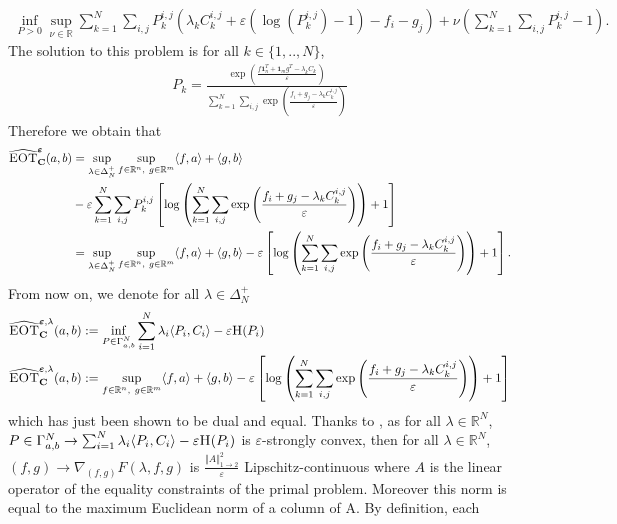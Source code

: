 \begin{prv*}
\begin{align*}
\inf_{P>0}\sup_{\nu \in\mathbb{R}}
   \sum_{k=1}^N \sum_{i,j} P_k^{i,j} \left(\lambda_k C_k^{i,j} +\varepsilon\left(\log(P_k^{i,j})-1\right) -f_i - g_j \right) +\nu\left(\sum_{k=1}^N \sum_{i,j} P_k^{i,j}-1 \right).
\end{align*}
The solution to this problem is for all $k\in\{1,..,N\}$,
\begin{align*}
     P_k = \frac{\exp\left(\frac{f\mathbf{1}_n^T + \mathbf{1}_m g^T-\lambda_k C_k}{\varepsilon}\right)}{\sum_{k=1}^N \sum_{i,j} \exp\left(\frac{f_i + g_j-\lambda_k C_k^{i,j}}{\varepsilon}\right)}
\end{align*}
Therefore we obtain that 
\begin{align*}
    \widehat{\textsc{EOT}}^{\bm{\varepsilon}}_{\mathbf{C}}(a,b)&=\sup_{\lambda\in\Delta_N^{+}}\sup_{f\in\mathbb{R}^n,~g\in\mathbb{R}^m} \langle f,a \rangle + \langle g, b \rangle\\
    &-  \varepsilon \sum_{k=1}^N \sum_{i,j} P_k^{i,j} \left[\log\left(\sum_{k=1}^N \sum_{i,j} \exp\left(\frac{f_i + g_j-\lambda_k C_k^{i,j}}{\varepsilon}\right)\right) + 1\right]\\
    &= \sup_{\lambda\in\Delta_N^{+}}\sup_{f\in\mathbb{R}^n,~g\in\mathbb{R}^m} \langle f,a \rangle + \langle g, b \rangle -  \varepsilon \left[\log\left(\sum_{k=1}^N \sum_{i,j} \exp\left(\frac{f_i + g_j-\lambda_k C_k^{i,j}}{\varepsilon}\right)\right) + 1\right].
\end{align*}
From now on, we denote for all $\lambda\in\Delta_N^{+}$ 
\begin{align*}
     \widehat{\textsc{EOT}}^{\bm{\varepsilon},\lambda}_{\mathbf{C}}(a,b)&:= \inf_{P\in \Gamma_{a,b}^N} \sum_{i=1}^N \lambda_i \langle P_i,C_i\rangle -\varepsilon \textsc{H}(P_i) \\
      \widehat{\textsc{EOT}}^{\bm{\varepsilon},\lambda}_{\mathbf{C}}(a,b)&:= \sup_{f\in\mathbb{R}^n,~g\in\mathbb{R}^m} \langle f,a \rangle + \langle g, b \rangle -  \varepsilon \left[\log\left(\sum_{k=1}^N \sum_{i,j} \exp\left(\frac{f_i + g_j-\lambda_k C_k^{i,j}}{\varepsilon}\right)\right) + 1\right] 
\end{align*}
which has just been shown to be dual and equal. Thanks to \citep[Theorem 1]{nesterov2005smooth}, as for all $\lambda\in\mathbb{R}^N$, $P\in\Gamma_{a,b}^N\rightarrow \sum_{i=1}^N \lambda_i \langle P_i,C_i\rangle -\varepsilon \textsc{H}(P_i)$ is $\varepsilon$-strongly convex, then for all $\lambda\in\mathbb{R}^N$, $(f,g)\rightarrow \nabla_{(f,g)} F(\lambda,f,g)$ is $\frac{\Vert A\Vert_{1\rightarrow 2}^2}{\varepsilon}$ Lipschitz-continuous where $A$ is the linear operator of the equality constraints of the primal problem. Moreover this norm is equal to the maximum Euclidean norm of a column of A. By definition, each

\end{prv*}
